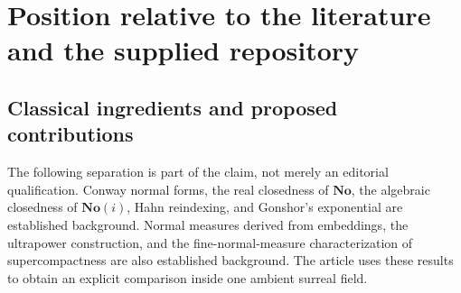 \documentclass[11pt,letterpaper]{article}
\numberwithin{equation}{section}
\theoremstyle{definition}
\theoremstyle{remark}
\newcommand{\No}{\mathbf{No}}
\begin{document}
\section{Position relative to the literature and the supplied repository}
\label{lce:sec:position}

\subsection{Classical ingredients and proposed contributions}
The following separation is part of the claim, not merely an editorial
qualification. Conway normal forms, the real closedness of $\No$, the
algebraic closedness of $\No(i)$, Hahn reindexing, and Gonshor's
exponential are established background. Normal measures derived from
embeddings, the ultrapower construction, and the fine-normal-measure
characterization of supercompactness are also established background.
The article uses these results to obtain an explicit comparison inside
one ambient surreal field.
\end{document}
